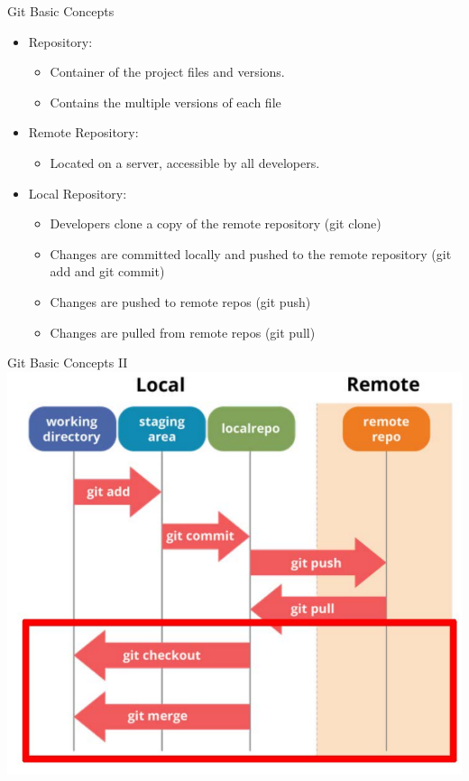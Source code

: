 \begin{frame}{Git Basic Concepts}
  \begin{itemize}
    \item Repository:
    \begin{itemize}
      \item Container of the project files and versions.
      \item Contains the multiple versions of each file
    \end{itemize}
    \item Remote Repository:
    \begin{itemize}
      \item Located on a server, accessible by all developers.
    \end{itemize}
    \item Local Repository:
    \begin{itemize}
      \item Developers clone a copy of the remote repository (git clone)
      \item Changes are committed locally and pushed to the remote repository (git add and git commit)
      \item Changes are pushed to remote repos (git push)
      \item Changes are pulled from remote repos (git pull)
    \end{itemize}
  \end{itemize}
\end{frame}

\begin{frame}{Git Basic Concepts II}
    \centering
    \includegraphics[width=0.5\linewidth]{trainingmaterials/git-I/gitflow.pdf }
\end{frame}

